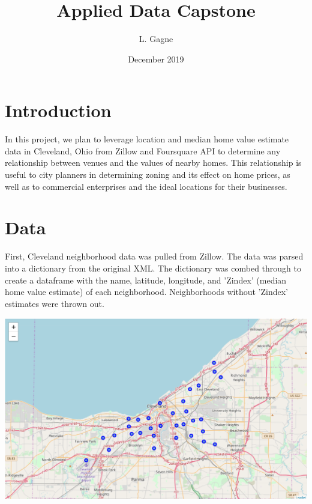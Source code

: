 \documentclass[twoside,14pt]{report}
\title{Applied Data Capstone}
\author{L. Gagne}
\date{December 2019}
\begin{document}
\maketitle

\chapter*{Introduction}


In this project, we plan to leverage location and median home value estimate data in Cleveland, Ohio from Zillow and Foursquare API to determine any relationship between venues and the values of nearby homes.  This relationship is useful to city planners in determining zoning and its effect on home prices, as well as to commercial enterprises and the ideal locations for their businesses.

\chapter*{Data}


First, Cleveland neighborhood data was pulled from Zillow.  The data was parsed into a dictionary from the original XML.  The dictionary was combed through to create a dataframe with the name, latitude, longitude, and 'Zindex' (median home value estimate) of each neighborhood.  Neighborhoods without 'Zindex' estimates were thrown out.

\begin{center}
\includegraphics[scale=.5]{Images/CleNeighborhoods.png}    
\end{center}
\end{document}
